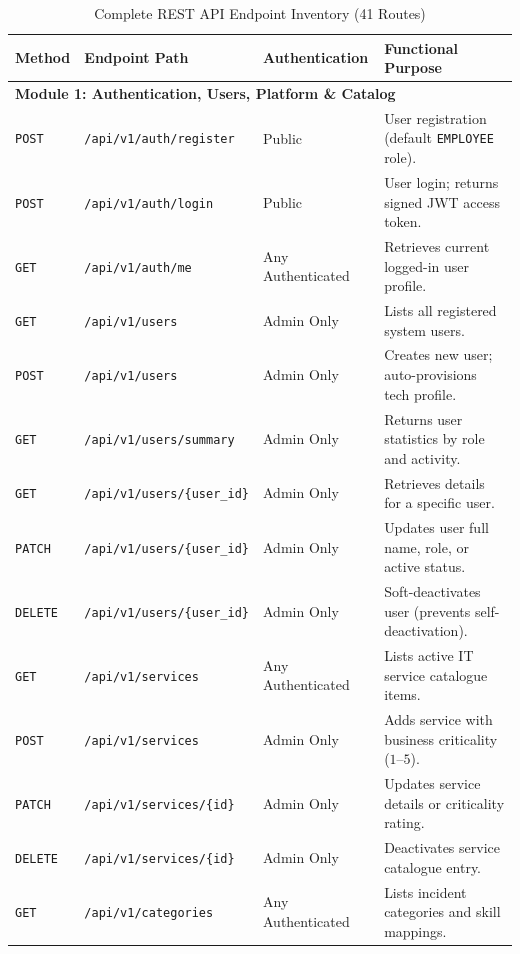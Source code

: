 \documentclass[11pt,a4paper,oneside]{report}
\begin{document}
\begin{table}[H]
\centering
\scriptsize
\caption{Complete REST API Endpoint Inventory (41 Routes)}
\label{tab:api_route_inventory}
\begin{tabular}{p{1.2cm}p{5.5cm}p{2.5cm}p{5.0cm}}
\toprule
\textbf{Method} & \textbf{Endpoint Path} & \textbf{Authentication} & \textbf{Functional Purpose} \\
\midrule
\multicolumn{4}{l}{\textbf{Module 1: Authentication, Users, Platform \& Catalog}} \\
\midrule
\texttt{POST} & \texttt{/api/v1/auth/register} & Public & User registration (default \texttt{EMPLOYEE} role). \\
\texttt{POST} & \texttt{/api/v1/auth/login} & Public & User login; returns signed JWT access token. \\
\texttt{GET} & \texttt{/api/v1/auth/me} & Any Authenticated & Retrieves current logged-in user profile. \\
\texttt{GET} & \texttt{/api/v1/users} & Admin Only & Lists all registered system users. \\
\texttt{POST} & \texttt{/api/v1/users} & Admin Only & Creates new user; auto-provisions tech profile. \\
\texttt{GET} & \texttt{/api/v1/users/summary} & Admin Only & Returns user statistics by role and activity. \\
\texttt{GET} & \texttt{/api/v1/users/\{user\_id\}} & Admin Only & Retrieves details for a specific user. \\
\texttt{PATCH} & \texttt{/api/v1/users/\{user\_id\}} & Admin Only & Updates user full name, role, or active status. \\
\texttt{DELETE} & \texttt{/api/v1/users/\{user\_id\}} & Admin Only & Soft-deactivates user (prevents self-deactivation). \\
\texttt{GET} & \texttt{/api/v1/services} & Any Authenticated & Lists active IT service catalogue items. \\
\texttt{POST} & \texttt{/api/v1/services} & Admin Only & Adds service with business criticality ($1$--$5$). \\
\texttt{PATCH} & \texttt{/api/v1/services/\{id\}} & Admin Only & Updates service details or criticality rating. \\
\texttt{DELETE} & \texttt{/api/v1/services/\{id\}} & Admin Only & Deactivates service catalogue entry. \\
\texttt{GET} & \texttt{/api/v1/categories} & Any Authenticated & Lists incident categories and skill mappings. \\

\end{tabular}
\end{table}
\end{document}
